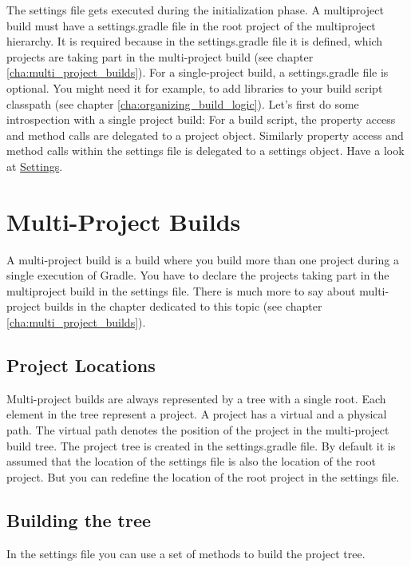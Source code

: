 The settings file gets executed during the initialization phase. A multiproject build must have a settings.gradle file in the root project of the multiproject hierarchy. It is required because in the settings.gradle file it is defined, which projects are taking part in the multi-project build (see chapter \ref{cha:multi_project_builds}). For a single-project build, a settings.gradle file is optional. You might need it for example, to add libraries to your build script classpath (see chapter \ref{cha:organizing_build_logic}). Let's first do some introspection with a single project build:
For a build script, the property access and method calls are delegated to a project object. Similarly property access and method calls within the settings file is delegated to a settings object. Have a look at \href{\API Settings.html}{\PKG Settings}.

\section{Multi-Project Builds} %
\label{sec:multi_project_builds}
A multi-project build is a build where you build more than one project during a single execution of Gradle. You have to declare the projects taking part in the multiproject build in the settings file. 
There is much more to say about multi-project builds in the chapter dedicated to this topic (see chapter \ref{cha:multi_project_builds}). 

\subsection{Project Locations} %
\label{sub:project_locations}
Multi-project builds are always represented by a tree with a single root. Each element in the tree represent a project. A project has a virtual and a physical path. The virtual path denotes the position of the project in the multi-project build tree. The project tree is created in the settings.gradle file. By default it is assumed that the location of the settings file is also the location of the root project. But you can redefine the location of the root project in the settings file.

\subsection{Building the tree} %
\label{sub:building_the_tree}
In the settings file you can use a set of methods to build the project tree. Hierarchical and flat physical layouts get special support. 
